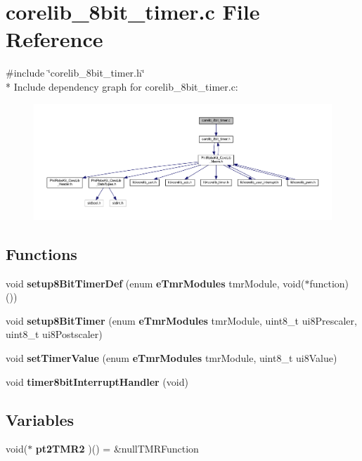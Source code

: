\section{corelib\-\_\-8bit\-\_\-timer.\-c File Reference}
\label{corelib__8bit__timer_8c}
{\ttfamily \#include \char`\"{}corelib\-\_\-8bit\-\_\-timer.\-h\char`\"{}}\\*
Include dependency graph for corelib\-\_\-8bit\-\_\-timer.\-c\-:\nopagebreak
\begin{figure}[H]
\begin{center}
\leavevmode
\includegraphics[width=350pt]{corelib__8bit__timer_8c__incl}
\end{center}
\end{figure}
\subsection*{Functions}
\begin{DoxyCompactItemize}
\item 
void {\bf setup8\-Bit\-Timer\-Def} (enum {\bf e\-Tmr\-Modules} tmr\-Module, void($\ast$function)())
\item 
void {\bf setup8\-Bit\-Timer} (enum {\bf e\-Tmr\-Modules} tmr\-Module, uint8\-\_\-t ui8\-Prescaler, uint8\-\_\-t ui8\-Postscaler)
\item 
void {\bf set\-Timer\-Value} (enum {\bf e\-Tmr\-Modules} tmr\-Module, uint8\-\_\-t ui8\-Value)
\item 
void {\bf timer8bit\-Interrupt\-Handler} (void)
\end{DoxyCompactItemize}
\subsection*{Variables}
\begin{DoxyCompactItemize}
\item 
void($\ast$ {\bf pt2\-T\-M\-R2} )() = \&null\-T\-M\-R\-Function
\end{DoxyCompactItemize}


